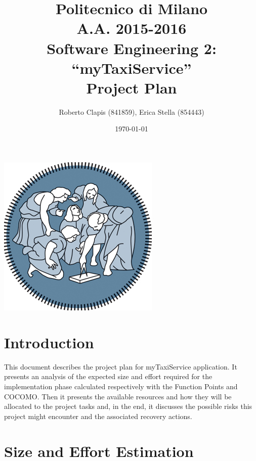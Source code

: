 \documentclass{article}
\author{Roberto Clapis (841859), Erica Stella (854443)}
\date{\today}
\title{Politecnico di Milano
	\\A.A. 2015\@-\@2016
	\\Software Engineering 2: ``myTaxiService''
	\\\textbf{P}roject \textbf{P}lan}
\begin{document}
\maketitle
\begin{center}
	\includegraphics{polimi-logo}
\end{center}
\clearpage
\tableofcontents
\clearpage
\section{Introduction}
This document describes the project plan for myTaxiService application.
It presents an analysis of the expected size and effort required 
for the implementation phase calculated respectively with the Function
Points and COCOMO. Then it presents the available resources and how 
they will be allocated to the project tasks and, in the end, it
discusses the possible risks this project might encounter and the
associated recovery actions.
\section{Size and Effort Estimation}
\end{document}
